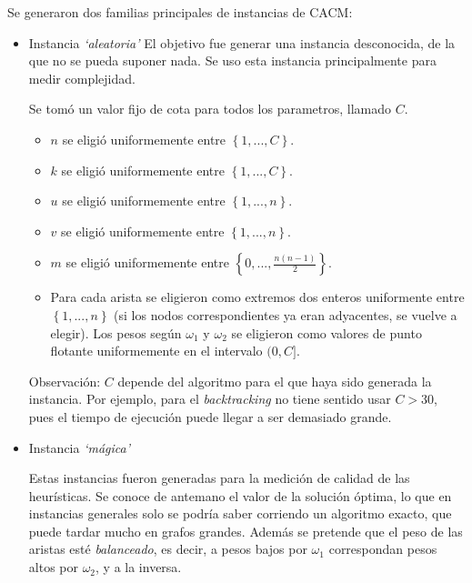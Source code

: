 Se generaron dos familias principales de instancias de CACM:

\begin{itemize}
    \item Instancia \textit{`aleatoria'}
El objetivo fue generar una instancia desconocida, de la que no se pueda suponer nada. Se uso esta instancia principalmente para medir complejidad.

Se tomó un valor fijo de cota para todos los parametros, llamado $C$.

\begin{itemize}
    \item $n$ se eligió uniformemente entre $\left\{{1, ..., C}\right\}$.
    \item $k$ se eligió uniformemente entre $\left\{{1, ..., C}\right\}$.
    \item $u$ se eligió uniformemente entre $\left\{{1, ..., n}\right\}$.
    \item $v$ se eligió uniformemente entre $\left\{{1, ..., n}\right\}$.
    \item $m$ se eligió uniformemente entre $\left\{{0, ..., \frac{n(n-1)}{2}}\right\}$.
    \item Para cada arista se eligieron como extremos dos enteros uniformente entre $\left\{{1, ..., n}\right\}$ (si los nodos correspondientes ya eran adyacentes, se vuelve a elegir). Los pesos según $\omega_1$ y $\omega_2$ se eligieron como valores de punto flotante uniformemente en el intervalo $(0, C]$.
\end{itemize}
Observación: $C$ depende del algoritmo para el que haya sido generada la instancia. Por ejemplo, para el \textit{backtracking} no tiene sentido usar $C > 30$, pues el tiempo de ejecución puede llegar a ser demasiado grande.

    \item Instancia \textit{`mágica'}

Estas instancias fueron generadas para la medición de calidad de las heurísticas. Se conoce de antemano el valor de la solución óptima, lo que en instancias generales solo se podría saber corriendo un algoritmo exacto, que puede tardar mucho en grafos grandes. Además se pretende que el peso de las aristas esté \textit{balanceado}, es decir, a pesos bajos por $\omega_1$ correspondan pesos altos por $\omega_2$, y a la inversa.


\end{itemize}
